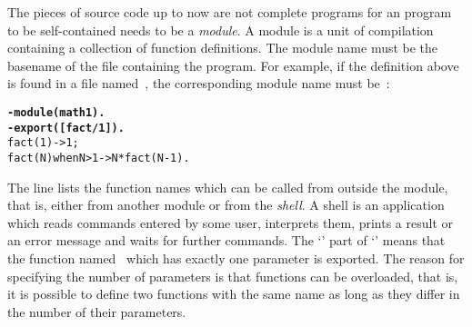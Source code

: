 The pieces of source code up to now are not complete \Erlang programs
for an \Erlang program to be self\hyp{}contained needs to be a
\emph{module}. A module is a unit of compilation containing a
collection of function definitions. The module name must be the
basename of the file containing the program. For example, if the
definition above is found in a file named~, the
corresponding module name must be~:
\begin{alltt}
\textbf{-module(math1).}\hfill% \emph{Drop the file extension} .erl
\textbf{-export([fact/1]).}
fact(1)            -> 1;
fact(N) when N > 1 -> N * fact(N-1).
\end{alltt}
The  line lists the function names which can be
called from outside the module, that is, either from another module or
from the \Erlang \emph{shell}. A shell is an application which reads
commands entered by some user, interprets them, prints a result or an
error message and waits for further commands. The `'
part of `' means that the function
named~ which has exactly one parameter is exported. The
reason for specifying the number of parameters is that \Erlang
functions can be overloaded, that is, it is possible to define two
functions with the same name as long as they differ in the number of
their parameters.

